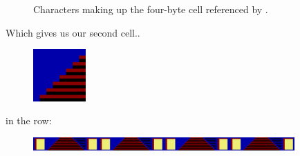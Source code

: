 \begin{figure}[H]                          
{                                          
  \setlength{\tabcolsep}{3.0pt}            
  \setlength\cmidrulewidth{\lightrulewidth}
    \begin{adjustbox}{width=5cm,center}
\begin{subfigure}{0.12\textwidth}

\end{subfigure}
\begin{subfigure}{0.12\textwidth}

\end{subfigure}
    \end{adjustbox}
    \begin{adjustbox}{width=5cm,center}
\begin{subfigure}{0.12\textwidth}

\end{subfigure}
\begin{subfigure}{0.12\textwidth}

\end{subfigure}
    \end{adjustbox}
  }\caption[]{Characters making up the four-byte cell referenced by .}
\end{figure}

Which gives us our second cell..
\begin{figure}[H]
  {
    \begin{adjustbox}{width=2cm,center}
        \includegraphics[width=2cm]{src/bonusphase/row21_cell1.png}%
    \end{adjustbox}
  }
\end{figure}

in the row:
\begin{figure}[H]
  {
    \setlength{\tabcolsep}{3.0pt}
    \setlength\cmidrulewidth{\heavyrulewidth} %
    \begin{adjustbox}{width=14cm,center}
          \includegraphics[width=10cm]{src/bonusphase/row_hex15.png}%
    \end{adjustbox}
  }
\end{figure}

